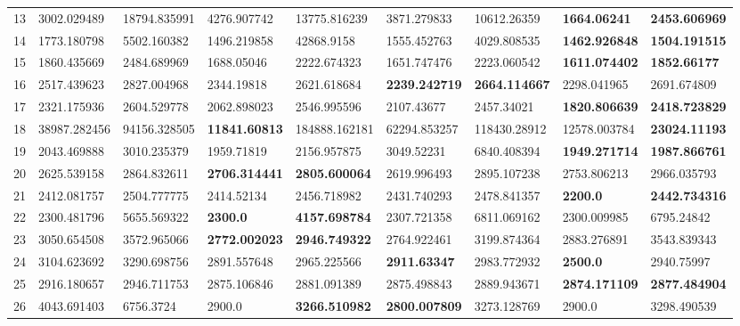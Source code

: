 \begin{table*}[t]
\begin{tabular}{|p{0.8cm}|p{1.6cm}|p{1.6cm}|p{1.6cm}|p{1.6cm}|p{1.6cm}|p{1.6cm}|p{1.6cm}|p{1.6cm}|}
13  & 3002.029489 & 18794.835991 & 4276.907742 & 13775.816239 & 3871.279833 & 10612.26359 & \textbf{1664.06241} & \textbf{2453.606969} \\ 
14  & 1773.180798 & 5502.160382 & 1496.219858 & 42868.9158 & 1555.452763 & 4029.808535 & \textbf{1462.926848} & \textbf{1504.191515} \\ 
15  & 1860.435669 & 2484.689969 & 1688.05046 & 2222.674323 & 1651.747476 & 2223.060542 & \textbf{1611.074402} & \textbf{1852.66177} \\ 
16  & 2517.439623 & 2827.004968 & 2344.19818 & 2621.618684 & \textbf{2239.242719} & \textbf{2664.114667} & 2298.041965 & 2691.674809 \\ 
17  & 2321.175936 & 2604.529778 & 2062.898023 & 2546.995596 & 2107.43677 & 2457.34021 & \textbf{1820.806639} & \textbf{2418.723829} \\ 
18  & 38987.282456 & 94156.328505 & \textbf{11841.60813} & 184888.162181 & 62294.853257 & 118430.28912 & 12578.003784 & \textbf{23024.11193} \\ 
19  & 2043.469888 & 3010.235379 & 1959.71819 & 2156.957875 & 3049.52231 & 6840.408394 & \textbf{1949.271714} & \textbf{1987.866761} \\ 
20  & 2625.539158 & 2864.832611 & \textbf{2706.314441} & \textbf{2805.600064} & 2619.996493 & 2895.107238 & 2753.806213 & 2966.035793 \\ 
21  & 2412.081757 & 2504.777775 & 2414.52134 & 2456.718982 & 2431.740293 & 2478.841357 & \textbf{2200.0} & \textbf{2442.734316} \\ 
22  & 2300.481796 & 5655.569322 & \textbf{2300.0} & \textbf{4157.698784} & 2307.721358 & 6811.069162 & 2300.009985 & 6795.24842 \\ 
23  & 3050.654508 & 3572.965066 & \textbf{2772.002023} & \textbf{2946.749322} & 2764.922461 & 3199.874364 & 2883.276891 & 3543.839343 \\ 
24  & 3104.623692 & 3290.698756 & 2891.557648 & 2965.225566 & \textbf{2911.63347} & 2983.772932 & \textbf{2500.0} & 2940.75997 \\ 
25  & 2916.180657 & 2946.711753 & 2875.106846 & 2881.091389 & 2875.498843 & 2889.943671 & \textbf{2874.171109} & \textbf{2877.484904} \\ 
26  & 4043.691403 & 6756.3724 & 2900.0 & \textbf{3266.510982} & \textbf{2800.007809} & 3273.128769 & 2900.0 & 3298.490539 \\ 

\end{tabular}
\end{table*}

